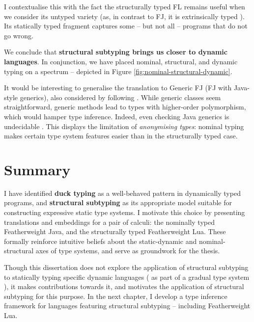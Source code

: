 I contextualise this with the fact the structurally typed FL remains useful when we consider its untyped variety (as, in contrast to FJ, it is extrinsically typed \cite{intrinsic-extrinsic}). Its statically typed fragment captures some -- but not all -- programs that do not go wrong.

We conclude that \textbf{structural subtyping brings us closer to dynamic languages}. In conjunction, we have placed nominal, structural, and dynamic typing on a spectrum -- depicted in Figure \ref{fig:nominal-structural-dynamic}.

It would be interesting to generalise the translation to Generic FJ (FJ with Java-style generics), also considered by \textcite{featherweight-java} following \textcite{generic-java}. While generic classes seem straightforward, generic methods lead to types with higher-order polymorphism, which would hamper type inference. Indeed, even checking Java generics is undecidable \cite{java-generics-undecidable}. This displays the limitation of \emph{anonymising types}: nominal typing makes certain type system features easier than in the structurally typed case.

\section{Summary}

I have identified \textbf{duck typing} as a well-behaved pattern in dynamically typed programs, and \textbf{structural subtyping} as its appropriate model suitable for constructing expressive static type systems. I motivate this choice by presenting translations and embeddings for a pair of calculi: the nominally typed Featherweight Java, and the structurally typed Featherweight Lua. These formally reinforce intuitive beliefs about the static-dynamic and nominal-structural axes of type systems, and serve as groundwork for the thesis.

Though this dissertation does not explore the application of structural subtyping to statically typing specific dynamic languages (\eg{} as part of a gradual type system \cite{gradual-typing-for-objects}), it makes contributions towards it, and motivates the application of structural subtyping for this purpose. In the next chapter, I develop a type inference framework for languages featuring structural subtyping -- including Featherweight Lua.

